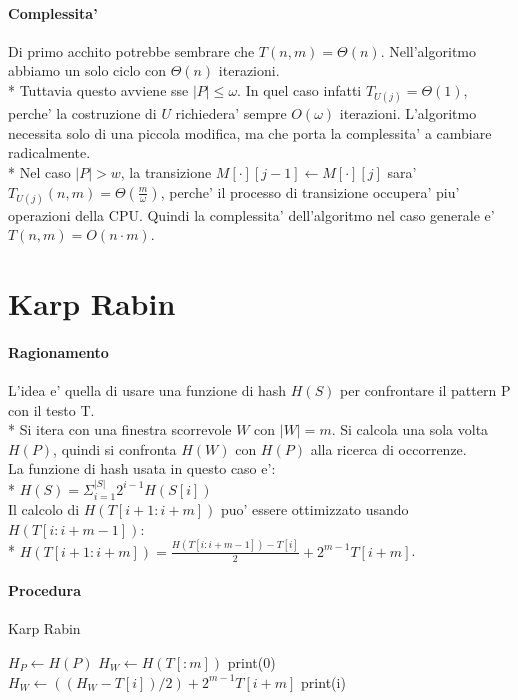 \pagebreak

\paragraph{Complessita'}

Di primo acchito potrebbe sembrare che $T(n, m) = \Theta(n)$.
Nell'algoritmo abbiamo un solo ciclo con $\Theta(n)$ iterazioni. \\*
Tuttavia questo avviene sse $|P| \leq \omega$. In quel caso infatti $T_{U(j)} = \Theta(1)$, perche' la costruzione di $U$ richiedera' sempre $O(\omega)$ iterazioni. L'algoritmo necessita solo di una piccola modifica, ma che porta la complessita' a cambiare radicalmente. \\*
Nel caso $|P| > w$, la transizione $M[\cdot][j-1] \leftarrow M[\cdot][j]$ sara' $T_{U(j)}(n,m) = \Theta(\frac m \omega)$, perche' il processo di transizione occupera' piu' operazioni della CPU.
Quindi la complessita' dell'algoritmo nel caso generale e' $T(n,m) = O(n \cdot m)$.

\section{Karp Rabin}

\paragraph{Ragionamento}

L'idea e' quella di usare una funzione di hash $H(S)$ per confrontare il pattern P con il testo T. \\*
Si itera con una finestra scorrevole $W$ con $|W| = m$. Si calcola una sola volta $H(P)$, quindi si confronta $H(W)$ con $H(P)$ alla ricerca di occorrenze. \\

La funzione di hash usata in questo caso e': \\*
$H(S) = \Sigma_{i=1}^{|S|} 2^{i-1} H(S[i])$ \\

Il calcolo di $H(T[i+1:i+m])$ puo' essere ottimizzato usando $H(T[i:i+m-1])$: \\*
$H(T[i+1:i+m]) = \frac {H(T[i:i+m-1]) - T[i]} 2 + 2^{m-1}T[i+m]$.

\paragraph{Procedura}

\begin{algorithm}
   \renewcommand\thealgorithm{}
    \caption{Karp Rabin}
    \begin{algorithmic}
            \State $H_{P} \gets H(P)$
            \State $H_{W} \gets H(T[:m])$
                \State print(0)
            \EndIf
                \State $H_{W} \gets ((H_{W} - T[i]) / 2) + 2^{m-1}T[i+m]$
                    \State print(i)
                \EndIf
            \EndFor
        \EndProcedure
    \end{algorithmic}
\end{algorithm}

